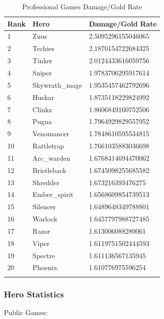 \documentclass{article}
\begin{document}
\begin{longtable}{|p{2.5cm}|p{2.5cm}|p{5.5cm}|}

\hline
\textbf{Rank} & \textbf{Hero} & \textbf{Damage/Gold Rate} \\
\hline
\endhead

1 & Zuus & 2.5095296155046065 \\\hline
2 & Techies & 2.1870154722684325 \\\hline
3 & Tinker & 2.0124433616059756 \\\hline
4 & Sniper & 1.9783706295917614 \\\hline
5 & Skywrath\_mage & 1.9535457462792696 \\\hline
6 & Huskar & 1.8735118229824992 \\\hline
7 & Clinkz & 1.8606849160752506 \\\hline
8 & Pugna & 1.7964929829557952 \\\hline
9 & Venomancer & 1.7848610595534815 \\\hline
10 & Rattletrap & 1.7661035883036698 \\\hline
11 & Arc\_warden & 1.6768414694470062 \\\hline
12 & Bristleback & 1.6745098255685582 \\\hline
13 & Shredder & 1.673216393476275 \\\hline
14 & Ember\_spirit & 1.6568609854739513 \\\hline
15 & Silencer & 1.6489648349788801 \\\hline
16 & Warlock & 1.6457797988727485 \\\hline
17 & Razor & 1.613006088280061 \\\hline
18 & Viper & 1.6119751502444593 \\\hline
19 & Spectre & 1.611136567135945 \\\hline
20 & Phoenix & 1.610776975596254 \\\hline

\caption{Professional Games Damage/Gold Rate}
\label{professional-games-damage-gold-rate}
\end{longtable}

\subsubsection{Hero Statistics}

Public Games:
\end{document}
